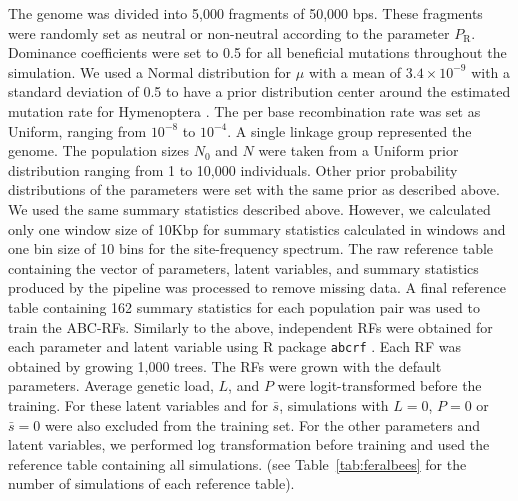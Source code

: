 \documentclass[a4paper, 12pt]{article}
\begin{document}
The genome was divided into 5,000 fragments of 50,000 bps. These fragments were randomly set as neutral or non-neutral according to the parameter $P_{\mathrm{R}}$. Dominance coefficients were set to 0.5 for all beneficial mutations throughout the simulation. We used a Normal distribution for $\mu$ with a mean of $3.4\times 10^{-9}$ with a standard deviation of 0.5 to have a prior distribution center around the estimated mutation rate for Hymenoptera \citep{Liu:2017ea}. The per base recombination rate was set as Uniform, ranging from $10^{-8}$ to $10^{-4}$. A single linkage group represented the genome. The population sizes $N_{\mathrm{0}}$ and $N$ were taken from a Uniform prior distribution ranging from 1 to 10,000 individuals. Other prior probability distributions of the parameters were set with the same prior as described above. We used the same summary statistics described above. However, we calculated only one window size of 10Kbp for summary statistics calculated in windows and one bin size of 10 bins for the site-frequency spectrum. The raw reference table containing the vector of parameters, latent variables, and summary statistics produced by the pipeline was processed to remove missing data. A final reference table containing 162 summary statistics for each population pair was used to train the ABC-RFs. Similarly to the above, independent RFs were obtained for each parameter and latent variable using R package \texttt{abcrf} \citep{Pudlo:2016il, Raynal:2019jj}. Each RF was obtained by growing 1,000 trees. The RFs were grown with the default parameters. Average genetic load, $L$, and $P$ were logit-transformed before the training. For these latent variables and for $\bar{s}$, simulations with $L=0$, $P=0$ or $\bar{s} = 0$ were also excluded from the training set. For the other parameters and latent variables, we performed log transformation before training and used the reference table containing all simulations.
(see Table~\ref{tab:feralbees} for the number of simulations of each reference table). 
\end{document}

